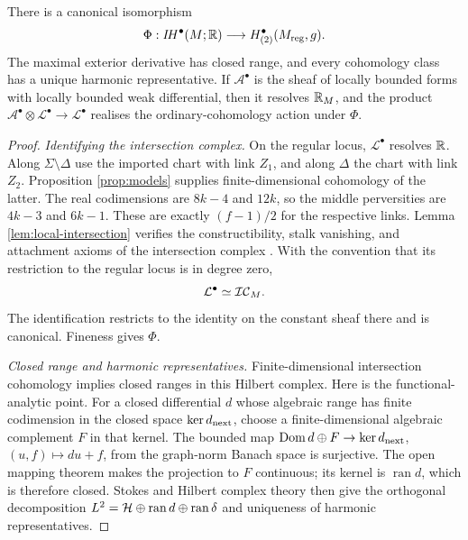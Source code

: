 \begin{theorem}\label{thm:T1}
There is a canonical isomorphism
\[
 \Phi:I\!H^\bullet(M;\mathbb R)\longrightarrow
 H^\bullet_{(2)}(M_{\mathrm{reg}},g).
\]
The maximal exterior derivative has closed range, and every
cohomology class has a unique harmonic representative. If
$\mathcal A^\bullet$ is the sheaf of locally bounded forms
with locally bounded weak differential, then it resolves
$\mathbb R_M$, and the product
$\mathcal A^\bullet\otimes\mathcal L^\bullet\to
\mathcal L^\bullet$ realises the ordinary-cohomology action
under $\Phi$.
\end{theorem}
\begin{proof}
\emph{Identifying the intersection complex.}
On the regular locus, $\mathcal L^\bullet$ resolves $\mathbb R$.
Along $\Sigma\setminus\Delta$ use the imported chart with
link $Z_1$, and along $\Delta$ the chart with link $Z_2$.
Proposition \ref{prop:models} supplies finite-dimensional
cohomology of the latter. The real codimensions are $8k-4$
and $12k$, so the middle perversities are $4k-3$ and $6k-1$.
These are exactly $(f-1)/2$ for the respective links.
Lemma \ref{lem:local-intersection} verifies the constructibility,
stalk vanishing, and attachment axioms of the intersection
complex \cite[\S3.3, Theorem~3.5]{gm83}. With the convention
that its restriction to the regular locus is in degree zero,
\[
 \mathcal L^\bullet\simeq\mathcal{IC}_M.
\]
The identification restricts to the identity on the constant
sheaf there and is canonical. Fineness gives $\Phi$.

\emph{Closed range and harmonic representatives.}
Finite-dimensional intersection cohomology implies closed
ranges in this Hilbert complex. Here is the functional-analytic
point. For a closed differential $d$ whose algebraic range has
finite codimension in the closed space $\ker d_{\rm next}$,
choose a finite-dimensional algebraic complement $F$ in that
kernel. The bounded map
$\operatorname{Dom} d\oplus F\to\ker d_{\rm next}$, $(u,f)\mapsto du+f$,
from the graph-norm Banach space is surjective. The open mapping
theorem makes the projection to $F$ continuous; its kernel is
$\operatorname{ran}d$, which is therefore closed. Stokes and
Hilbert complex theory then give the orthogonal decomposition
$L^2=\mathcal H\oplus\operatorname{ran}d\oplus\operatorname{ran}\delta$
and uniqueness of harmonic representatives.


\end{proof}

